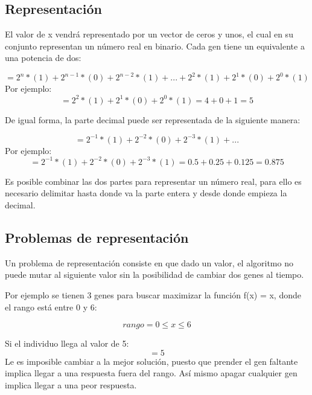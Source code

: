\documentclass[10pt]{report}
\begin{document}
\subsection*{Representación}
El valor de x vendrá representado por un vector de ceros y unos, el cual en su conjunto representan un número real en binario. Cada gen tiene un equivalente a una potencia de dos:

\begin{equation*}
    [1,0,1,...,1,0,1] = 2^{n}*(1)+2^{n-1}*(0)+2^{n-2}*(1)+...+2^{2}*(1)+2^{1}*(0)+2^{0}*(1)
\end{equation*}
Por ejemplo:
\begin{equation*}
    [1,0,1] = 2^{2}*(1)+2^{1}*(0)+2^{0}*(1) = 4+0+1 = 5
\end{equation*}

De igual forma, la parte decimal puede ser representada de la siguiente manera:

\begin{equation*}
    [1,0,1,...] = 2^{-1}*(1)+2^{-2}*(0)+2^{-3}*(1)+...
\end{equation*}
Por ejemplo:
\begin{equation*}
    [1,0,1] = 2^{-1}*(1)+2^{-2}*(0)+2^{-3}*(1) = 0.5+0.25+0.125 = 0.875
\end{equation*}

Es posible combinar las dos partes para representar un número real, para ello es necesario delimitar hasta donde va la parte entera y desde donde empieza la decimal.

\subsection*{Problemas de representación}

Un problema de representación consiste en que dado un valor, el algoritmo no puede mutar al siguiente valor sin la posibilidad de cambiar dos genes al tiempo.

Por ejemplo se tienen 3 genes para buscar maximizar la función f(x) = x, donde el rango está entre 0 y 6:

\begin{equation*}
    rango = 0\leq x \leq 6
\end{equation*}

Si el individuo llega al valor de 5:
\begin{equation*}
    [1,0,1] = 5
\end{equation*}
Le es imposible cambiar a la mejor solución, puesto que prender el gen faltante implica llegar a una respuesta fuera del rango. Así mismo apagar cualquier gen implica llegar a una peor respuesta.
\end{document}
